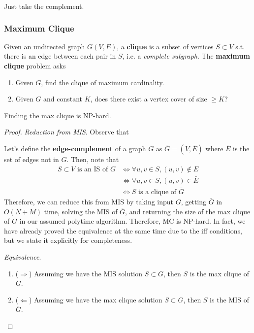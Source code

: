     \begin{example}
      Just take the complement. 
    \end{example}

  \subsubsection{Maximum Clique}

    \begin{definition}
      Given an undirected graph $G(V, E)$, a \textbf{clique} is a subset of vertices $S \subset V$ s.t. there is an edge between each pair in $S$, i.e. a \textit{complete subgraph}. The \textbf{maximum clique} problem asks 
      \begin{enumerate}
        \item Given $G$, find the clique of maximum cardinality. 
        \item Given $G$ and constant $K$, does there exist a vertex cover of size $\geq K$? 
      \end{enumerate}
    \end{definition} 

    \begin{theorem}[MC]
      Finding the max clique is NP-hard. 
    \end{theorem}
    \begin{proof}
      \textit{Reduction from MIS}. Observe that 

      Let's define the \textbf{edge-complement} of a graph $G$ as $\bar{G} = (V, \bar{E})$ where $\bar{E}$ is the set of edges not in $G$. Then, note that 
      \begin{align}
        S \subset V \text{ is an IS of } G & \iff \forall u, v \in S, (u, v) \not\in E  \\
                                           & \iff \forall u, v \in S, (u, v) \in \bar{E} \\
                                           & \iff S \text{ is a clique of } \bar{G} 
      \end{align}
      Therefore, we can reduce this from MIS by taking input $G$, getting $\bar{G}$ in $O(N + M)$ time, solving the MIS of $\bar{G}$, and returning the size of the max clique of $\bar{G}$ in our assumed polytime algorithm. Therefore, MC is NP-hard. In fact, we have already proved the equivalence at the same time due to the iff conditions, but we state it explicitly for completeness. 

      \textit{Equivalence}. 
      \begin{enumerate}
        \item ($\Rightarrow$) Assuming we have the MIS solution $S \subset G$, then $S$ is the max clique of $\bar{G}$. 
        \item ($\Leftarrow$) Assuming we have the max clique solution $S \subset G$, then $S$ is the MIS of $\bar{G}$. 
      \end{enumerate}
    \end{proof}

